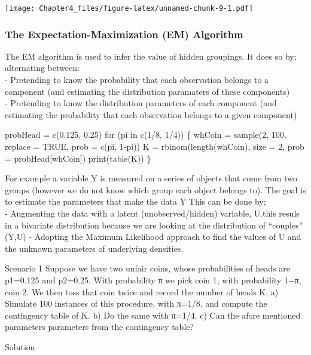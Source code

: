\documentclass[]{article}
\begin{document}
\texttt{[image: Chapter4\_files/figure-latex/unnamed-chunk-9-1.pdf]}

\hypertarget{the-expectation-maximization-em-algorithm}{%
\subsubsection{The Expectation-Maximization (EM)
Algorithm}\label{the-expectation-maximization-em-algorithm}}

The EM algorithm is used to infer the value of hidden groupings. It does
so by; alternating between:\\
- Pretending to know the probability that each observation belongs to a
component (and estimating the distribution paramaters of these
components)\\
- Pretending to know the distribution parameters of each component (and
estimating the probability that each observation belongs to a given
component)

probHead = c(0.125, 0.25) for (pi in c(1/8, 1/4)) \{ whCoin = sample(2,
100, replace = TRUE, prob = c(pi, 1-pi)) K = rbinom(length(whCoin), size
= 2, prob = probHead{[}whCoin{]}) print(table(K)) \}

For example a variable Y is measured on a series of objects that come
from two groups (however we do not know which group each object belongs
to). The goal is to estimate the parameters that make the data Y This
can be done by;\\
- Augmenting the data with a latent (unobserved/hidden) variable, U.this
resuls in a bivariate distribution because we are looking at the
distribution of ``couples'' (Y,U) - Adopting the Maximum Likelihood
approach to find the values of U and the unknown parameters of
underlying densities.

Scenario 1 Suppose we have two unfair coins, whose probabilities of
heads are p1=0.125 and p2=0.25. With probability π we pick coin 1, with
probability 1−π, coin 2. We then toss that coin twice and record the
number of heads K. a) Simulate 100 instances of this procedure, with
π=1/8, and compute the contingency table of K. b) Do the same with
π=1/4. c) Can the afore mentioned parameters parameters from the
contingency table?

Solution
\end{document}
